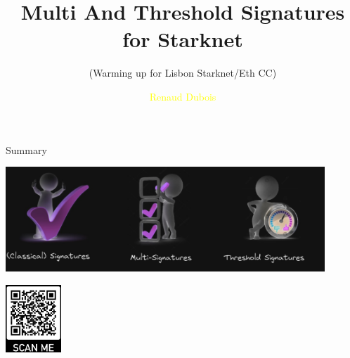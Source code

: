 \documentclass[aspectratio=43]{beamer}
\title{Multi And Threshold Signatures for Starknet} %
\subtitle{(Warming up for Lisbon Starknet/Eth CC)}
\author[R. Dubois]{\textcolor{yellow}{Renaud Dubois} }
\institute[LIT]{
    \textcolor{white}{Ledger}%
    \\%
    \textcolor{white}{Innovation Team}%
    \date{\today}
    
    
} %
\begin{document}
    
    \frame{\titlepage }
   

    \begin{frame}{Summary}
     
     {
     \begin{center}
     \includegraphics[width=12cm]{images/concepts.jpg}
     \end{center}
     }
     {
        \tableofcontents
        \begin{center}
        \includegraphics[width=2.1cm]{images/qrslides.jpg}
        \end{center}
      }  
   
    \end{frame} 
\end{document}
